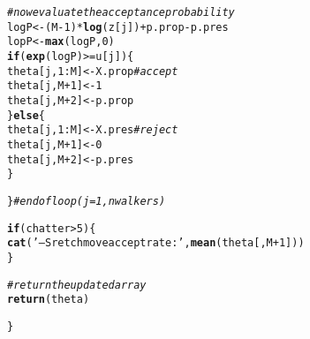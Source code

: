 \documentclass{article}\usepackage[]{graphicx}\usepackage[]{color}
\makeatletter
\newcommand{\hlnum}[1]{\textcolor[rgb]{0.686,0.059,0.569}{#1}}%
\newcommand{\hlstr}[1]{\textcolor[rgb]{0.192,0.494,0.8}{#1}}%
\newcommand{\hlcom}[1]{\textcolor[rgb]{0.678,0.584,0.686}{\textit{#1}}}%
\newcommand{\hlopt}[1]{\textcolor[rgb]{0,0,0}{#1}}%
\newcommand{\hlstd}[1]{\textcolor[rgb]{0.345,0.345,0.345}{#1}}%
\newcommand{\hlkwa}[1]{\textcolor[rgb]{0.161,0.373,0.58}{\textbf{#1}}}%
\newcommand{\hlkwb}[1]{\textcolor[rgb]{0.69,0.353,0.396}{#1}}%
\newcommand{\hlkwd}[1]{\textcolor[rgb]{0.737,0.353,0.396}{\textbf{#1}}}%
\newenvironment{kframe}{%
 \def\at@end@of@kframe{}%
 \ifinner\ifhmode%
  \def\at@end@of@kframe{\end{minipage}}%
  \begin{minipage}{\columnwidth}%
 \fi\fi%
 \def\FrameCommand##1{\hskip\@totalleftmargin \hskip-\fboxsep
 \colorbox{shadecolor}{##1}\hskip-\fboxsep
     \hskip-\linewidth \hskip-\@totalleftmargin \hskip\columnwidth}%
 \MakeFramed {\advance\hsize-\width
   \@totalleftmargin\z@ \linewidth\hsize
   \@setminipage}}%
 {\par\unskip\endMakeFramed%
 \at@end@of@kframe}
\newenvironment{knitrout}{}{} %
\makeatother
\begin{document}
\begin{knitrout}
\begin{kframe}
\begin{alltt}
    \hlcom{# now evaluate the acceptance probability}
    \hlstd{logP} \hlkwb{<-} \hlstd{(M}\hlopt{-}\hlnum{1}\hlstd{)}\hlopt{*}\hlkwd{log}\hlstd{(z[j])} \hlopt{+} \hlstd{p.prop} \hlopt{-} \hlstd{p.pres}
    \hlstd{lopP} \hlkwb{<-} \hlkwd{max}\hlstd{(logP,} \hlnum{0}\hlstd{)}
    \hlkwa{if} \hlstd{(} \hlkwd{exp}\hlstd{(logP)} \hlopt{>=} \hlstd{u[j] ) \{}
      \hlstd{theta[j,} \hlnum{1}\hlopt{:}\hlstd{M]} \hlkwb{<-} \hlstd{X.prop}     \hlcom{# accept}
      \hlstd{theta[j, M}\hlopt{+}\hlnum{1}\hlstd{]} \hlkwb{<-} \hlnum{1}
      \hlstd{theta[j, M}\hlopt{+}\hlnum{2}\hlstd{]} \hlkwb{<-} \hlstd{p.prop}
    \hlstd{\}} \hlkwa{else} \hlstd{\{}
      \hlstd{theta[j,} \hlnum{1}\hlopt{:}\hlstd{M]} \hlkwb{<-} \hlstd{X.pres}     \hlcom{# reject}
      \hlstd{theta[j, M}\hlopt{+}\hlnum{1}\hlstd{]} \hlkwb{<-} \hlnum{0}
      \hlstd{theta[j, M}\hlopt{+}\hlnum{2}\hlstd{]} \hlkwb{<-} \hlstd{p.pres}
    \hlstd{\}}

  \hlstd{\}} \hlcom{# end of loop (j = 1, nwalkers)}

  \hlkwa{if} \hlstd{(chatter} \hlopt{>} \hlnum{5}\hlstd{) \{}
    \hlkwd{cat}\hlstd{(}\hlstr{'-- Sretch move accept rate:'}\hlstd{,} \hlkwd{mean}\hlstd{(theta[,M}\hlopt{+}\hlnum{1}\hlstd{]))}
  \hlstd{\}}

  \hlcom{# return the updated array }
  \hlkwd{return}\hlstd{(theta)}

\hlstd{\}}
\end{alltt}
\end{kframe}
\end{knitrout}
\end{document}
